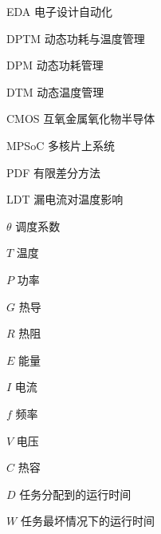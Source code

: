 
\begin{denotation}

\item[EDA] 电子设计自动化
\item[DPTM] 动态功耗与温度管理
\item[DPM]	动态功耗管理
\item[DTM]  动态温度管理
\item[CMOS]	互氧金属氧化物半导体
\item[MPSoC]	多核片上系统
\item[PDF]	有限差分方法
\item[LDT]	漏电流对温度影响
\item [$\theta$] 调度系数
\item[$T$] 温度
\item[$P$] 功率
\item[$G$] 热导
\item[$R$] 热阻
\item[$E$] 能量
\item[$I$] 电流
\item[$f$] 频率
\item[$V$] 电压
\item[$C$] 热容
\item[$D$] 任务分配到的运行时间
\item[$W$] 任务最坏情况下的运行时间

\end{denotation}
